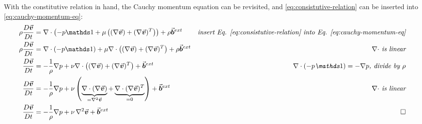 With the constitutive relation in hand, the Cauchy momentum equation can be revisited, and \autoref{eq:consistutive-relation} can be inserted into \autoref{eq:cauchy-momentum-eq}:
\begin{align}
    \label{eq:ns-deriv-step-1}\rho\frac{D\vek{v}}{Dt} & =  \nabla\cdot\left(-p\mat{1} + \mu\left((\nabla \vek{v}) + (\nabla \vek{v})^T\right)\right) + \rho\vek{b}^{ext}                                                         & \textit{insert Eq. \ref{eq:consistutive-relation} into Eq. \ref{eq:cauchy-momentum-eq}} \\
    \label{eq:ns-deriv-step-2}\rho\frac{D\vek{v}}{Dt} & = \nabla\cdot (-p\mat{1}) + \mu\nabla\cdot\left((\nabla \vek{v}) + (\nabla \vek{v})^T\right)+\rho\vek{b}^{ext}                                                           & \textit{$\nabla\cdot$ is linear}                                                        \\
    \label{eq:ns-deriv-step-3}\frac{D\vek{v}}{Dt}     & = -\frac{1}{\rho}\nabla p + \nu\nabla\cdot\left((\nabla \vek{v}) + (\nabla \vek{v})^T\right)+\vek{b}^{ext}                                                               & \textit{$\nabla\cdot (-p\mat{1}) = -\nabla p$, divide by $\rho$}                        \\
    \label{eq:ns-deriv-step-4}\frac{D\vek{v}}{Dt}     & = -\frac{1}{\rho}\nabla p + \nu\left(\underbrace{\nabla\cdot(\nabla \vek{v})}_{=\Laplace\vek{v}} + \underbrace{\nabla\cdot(\nabla \vek{v})^T}_{=0} \right)+\vek{b}^{ext} & \textit{$\nabla\cdot$ is linear}                                                        \\
    \label{eq:ns-deriv-step-5}\frac{D\vek{v}}{Dt}     & = -\frac{1}{\rho}\nabla p + \nu\Laplace\vek{v}+\vek{b}^{ext}                                                                                                             & \square
\end{align}


